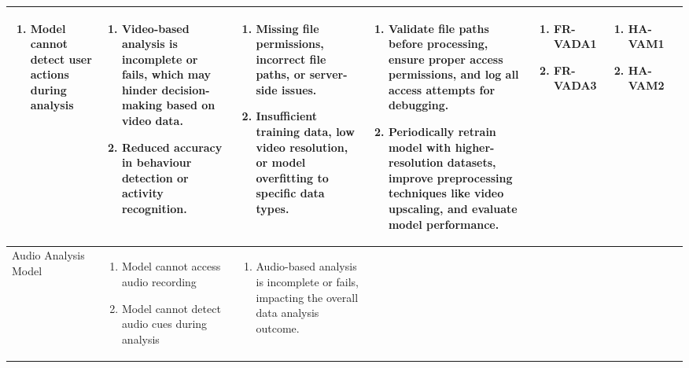 \documentclass{article}
\begin{document}
\begin{landscape}
\begin{longtable}{|p{3cm}|p{3cm}|p{4cm}|p{4cm}|p{3cm}|p{2cm}|p{3cm}|}
\begin{enumerate}[leftmargin=*]
      \item Model cannot detect user actions during analysis
  \end{enumerate} & 
  \begin{enumerate}[leftmargin=*]
      \item Video-based analysis is incomplete or fails, which may hinder decision-making based on video data.
      \item Reduced accuracy in behaviour detection or activity recognition.
  \end{enumerate} &
  \begin{enumerate}[leftmargin=*]
       \item Missing file permissions, incorrect file paths, or server-side issues.
       \item Insufficient training data, low video resolution, or model overfitting to specific data types.
  \end{enumerate} &
  \begin{enumerate}[leftmargin=*]
       \item Validate file paths before processing, ensure proper access permissions, and log all access attempts for debugging.
       \item Periodically retrain model with higher-resolution datasets, improve preprocessing techniques like video upscaling, and evaluate model performance.
  \end{enumerate} &
  \begin{enumerate}[leftmargin=*]
       \item FR-VADA1
       \item FR-VADA3
  \end{enumerate} &
  \begin{enumerate}[leftmargin=*]
       \item HA-VAM1
       \item HA-VAM2
  \end{enumerate} \\
  \hline
  Audio Analysis Model & 
  \begin{enumerate}[leftmargin=*]
      \item Model cannot access audio recording
      \item Model cannot detect audio cues during analysis
  \end{enumerate} & 
  \begin{enumerate}[leftmargin=*]
      \item Audio-based analysis is incomplete or fails, impacting the overall data analysis outcome.

\end{enumerate}
\end{longtable}
\end{landscape}
\end{document}
